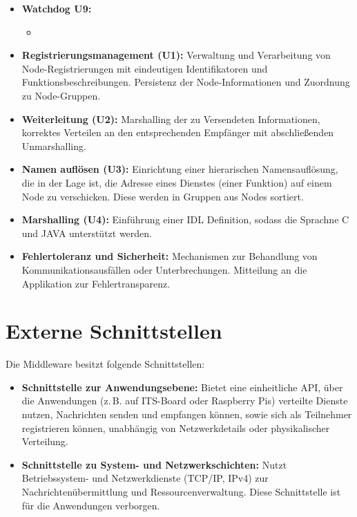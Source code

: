 \begin{itemize}
	\item \textbf{Watchdog U9:}\\
	\begin{itemize}
		\item 
	\end{itemize}
	

	\item \textbf{Registrierungsmanagement (U1):}  
	Verwaltung und Verarbeitung von Node-Registrierungen mit eindeutigen Identifikatoren und Funktionsbeschreibungen.  
	Persistenz der Node-Informationen und Zuordnung zu Node-Gruppen.
	
	\item \textbf{Weiterleitung (U2):}  
	Marshalling der zu Versendeten Informationen, korrektes Verteilen an den entsprechenden Empfänger mit abschließenden Unmarshalling.
	
	\item \textbf{Namen auflösen (U3):}  
	Einrichtung einer hierarischen Namensauflösung, die in der Lage ist, die Adresse eines Dienstes (einer Funktion) auf einem Node zu verschicken. Diese werden in Gruppen aus Nodes sortiert.
	
	\item \textbf{Marshalling (U4):}  
	Einführung einer IDL Definition, sodass die Sprachne C und JAVA unterstützt werden.
	
	\item \textbf{Fehlertoleranz und Sicherheit:}  
	Mechanismen zur Behandlung von Kommunikationsausfällen oder Unterbrechungen. Mitteilung an die Applikation zur Fehlertransparenz.
\end{itemize}

\section{Externe Schnittstellen}

Die Middleware besitzt folgende Schnittstellen:

\begin{itemize}
	\item \textbf{Schnittstelle zur Anwendungsebene:}  
	Bietet eine einheitliche API, über die Anwendungen (z.\,B. auf ITS-Board oder Raspberry Pis) verteilte Dienste nutzen, Nachrichten senden und empfangen können, sowie sich als Teilnehmer registrieren können, unabhängig von Netzwerkdetails oder physikalischer Verteilung.
	
	\item \textbf{Schnittstelle zu System- und Netzwerkschichten:}  
	Nutzt Betriebssystem- und Netzwerkdienste (TCP/IP, IPv4) zur Nachrichtenübermittlung und Ressourcenverwaltung. Diese Schnittstelle ist für die Anwendungen verborgen.
\end{itemize}